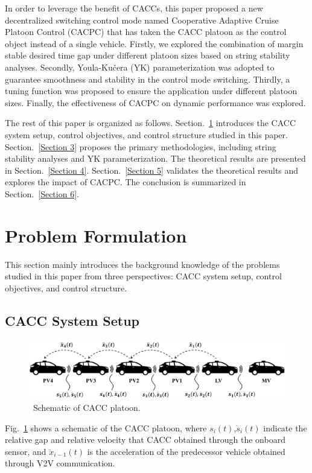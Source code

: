 \documentclass[trsc,nonblindrev]{informs3} %
\begin{document}
In order to leverage the benefit of CACCs, this paper proposed a new decentralized switching control mode named Cooperative Adaptive Cruise Platoon Control (CACPC) that has taken the CACC platoon as the control object instead of a single vehicle. Firstly, we explored the combination of margin stable desired time gap under different platoon sizes based on string stability analyses. Secondly, Youla-Kučera (YK) parameterization was adopted to guarantee smoothness and stability in the control mode switching. Thirdly, a tuning function was proposed to ensure the application under different platoon sizes. Finally, the effectiveness of CACPC on dynamic performance was explored.

The rest of this paper is organized as follows. Section.~\ref{Section 2} introduces the CACC system setup, control objectives, and control structure studied in this paper. Section.~\ref{Section 3} proposes the primary methodologies, including string stability analyses and YK parameterization. The theoretical results are presented in Section.~\ref{Section 4}. Section.~\ref{Section 5} validates the theoretical results and explores the impact of CACPC. The conclusion is summarized in Section.~\ref{Section 6}.


\section{Problem Formulation}
\label{Section 2}
This section mainly introduces the background knowledge of the problems studied in this paper from three perspectives: CACC system setup, control objectives, and control structure.


\subsection{CACC System Setup}
\label{Section 2.1}

\begin{figure}
    \centering
    \includegraphics[width=14cm]{figs/fig1.png}
    \caption{~Schematic of CACC platoon.}
    \label{fig1}
\end{figure}

Fig.~\ref{fig1} shows a schematic of the CACC platoon, where $s_i (t)$,$\dot{s}_{i} (t)$ indicate the relative gap and relative velocity that CACC obtained through the onboard sensor, and $\ddot{x}_{i-1} (t)$ is the acceleration of the predecessor vehicle obtained through V2V communication.
\end{document}
